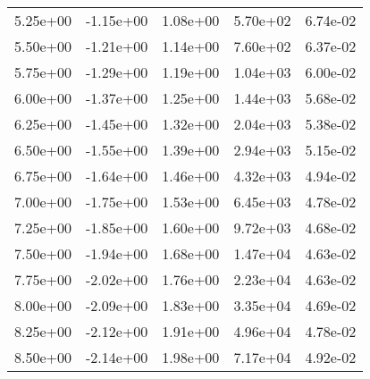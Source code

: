\begin{tabular}{rrrrr}
5.25e+00 &         -1.15e+00 &              1.08e+00 &                     5.70e+02 &       6.74e-02 \\
5.50e+00 &         -1.21e+00 &              1.14e+00 &                     7.60e+02 &       6.37e-02 \\
5.75e+00 &         -1.29e+00 &              1.19e+00 &                     1.04e+03 &       6.00e-02 \\
6.00e+00 &         -1.37e+00 &              1.25e+00 &                     1.44e+03 &       5.68e-02 \\
6.25e+00 &         -1.45e+00 &              1.32e+00 &                     2.04e+03 &       5.38e-02 \\
6.50e+00 &         -1.55e+00 &              1.39e+00 &                     2.94e+03 &       5.15e-02 \\
6.75e+00 &         -1.64e+00 &              1.46e+00 &                     4.32e+03 &       4.94e-02 \\
7.00e+00 &         -1.75e+00 &              1.53e+00 &                     6.45e+03 &       4.78e-02 \\
7.25e+00 &         -1.85e+00 &              1.60e+00 &                     9.72e+03 &       4.68e-02 \\
7.50e+00 &         -1.94e+00 &              1.68e+00 &                     1.47e+04 &       4.63e-02 \\
7.75e+00 &         -2.02e+00 &              1.76e+00 &                     2.23e+04 &       4.63e-02 \\
8.00e+00 &         -2.09e+00 &              1.83e+00 &                     3.35e+04 &       4.69e-02 \\
8.25e+00 &         -2.12e+00 &              1.91e+00 &                     4.96e+04 &       4.78e-02 \\
8.50e+00 &         -2.14e+00 &              1.98e+00 &                     7.17e+04 &       4.92e-02 \\
\bottomrule
\end{tabular}
